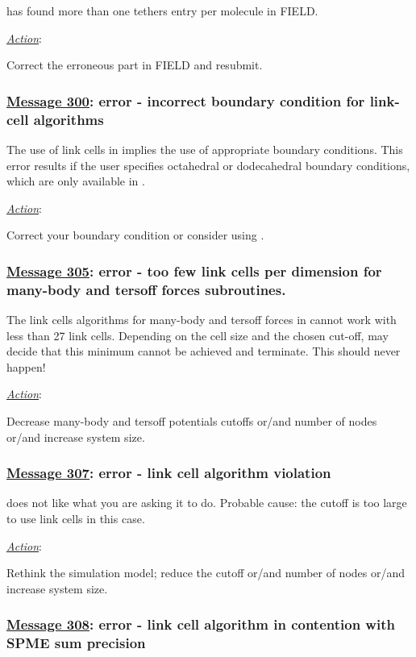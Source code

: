 \D has found more than one tethers entry per molecule in FIELD.

\noindent \underline{\em Action}:

Correct the erroneous part in FIELD and resubmit.

\subsubsection*{\underline{Message 300}: error - incorrect boundary condition for link-cell algorithms}

The use of link cells in \D implies the use of appropriate
boundary conditions.  This error results if the user specifies
octahedral or dodecahedral boundary conditions, which are only
available in \C.

\noindent \underline{\em Action}:

Correct your boundary condition or consider using \C.

\subsubsection*{\underline{Message 305}: error - too few link cells per dimension for many-body and tersoff forces subroutines.}

The link cells algorithms for many-body and tersoff forces in \D
cannot work with less than 27 link cells.  Depending on the cell
size and the chosen cut-off, \D may decide that this minimum
cannot be achieved and terminate. This should never happen!

\noindent \underline{\em Action}:

Decrease many-body and tersoff potentials cutoffs or/and number of
nodes or/and increase system size.

\subsubsection*{\underline{Message 307}: error - link cell algorithm violation}

\D does not like what you are asking it to do.  Probable cause:
the cutoff is too large to use link cells in this case.

\noindent \underline{\em Action}:

Rethink the simulation model; reduce the cutoff or/and number of
nodes or/and increase system size.

\subsubsection*{\underline{Message 308}: error - link cell algorithm in contention with SPME sum precision}

